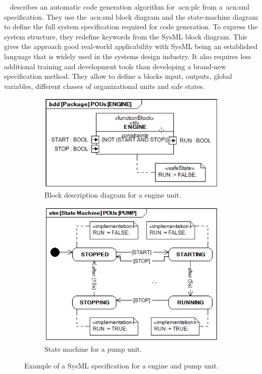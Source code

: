 \citeauthor{6957399}~\cite{6957399} describes an automatic code generation algorithm for~\acrshort{acn:plc} from a~\acrshort{acn:sml} specification.
They use the~\acrshort{acn:sml} block diagram and the state-machine diagram to define the full system specification required for code generation.
To express the system structure, they redefine keywords from the SysML block diagram.
This gives the approach good real-world applicability with SysML being an established language that is widely used in the systems design industry.
It also requires less additional training and development tools than developing a brand-new specification method.
They allow to define a blocks input, outputs, global variables, different classes of organizational units and safe states.
\begin{figure}[h]
	\begin{subfigure}{0.5\textwidth}
		\includegraphics[width=\textwidth]{./Figures/sysml_bdd.png}
		\caption{Block description diagram for a engine unit.}
		\label{fig:sysml:bdd}
	\end{subfigure}
	\begin{subfigure}{0.5\textwidth}
		\includegraphics[width=\textwidth]{./Figures/sysml_stm.png}
		\caption{State machine for a pump unit.}
		\label{fig:sysml:stm}
	\end{subfigure}
	\caption[Example of a SysML specification for an engine and pump unit.]{Example of a SysML specification for a engine and pump unit.~\cite{6957399}}
\end{figure}
